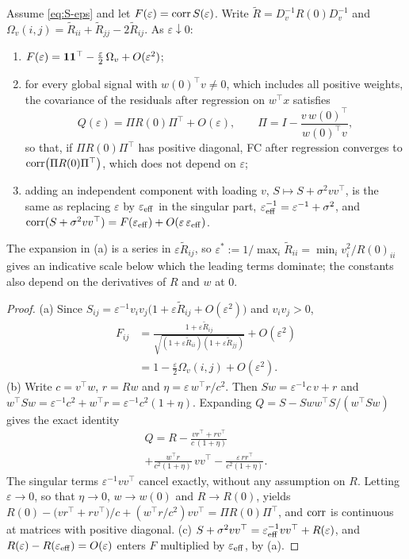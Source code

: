 \begin{theorem}\label{thm:confound}
Assume \eqref{eq:S-eps} and let $F(\varepsilon)=\operatorname{corr} S(\varepsilon)$. Write
$\tilde R=D_v^{-1}R(0)D_v^{-1}$ and $\Omega_v(i,j)=\tilde R_{ii}+\tilde R_{jj}-2\tilde R_{ij}$. As $\varepsilon\downarrow0$:
\begin{enumerate}
  \item[(a)] $F(\varepsilon)=\mathbf 1\mathbf 1^\top-\tfrac{\varepsilon}{2}\,\Omega_v+O(\varepsilon^2)$;
  \item[(b)] for every global signal with $w(0)^\top v\ne0$, which includes all positive weights, the covariance of the residuals after regression on $w^\top x$ satisfies
  \[
    Q(\varepsilon)=\Pi R(0)\Pi^\top+O(\varepsilon),\qquad \Pi=I-\frac{v\,w(0)^\top}{w(0)^\top v},
  \]
  so that, if $\Pi R(0)\Pi^\top$ has positive diagonal, FC after regression converges to $\operatorname{corr}\bigl(\Pi R(0)\Pi^\top\bigr)$, which does not depend on $\varepsilon$;
  \item[(c)] adding an independent component with loading $v$, $S\mapsto S+\sigma^2vv^\top$, is the same as replacing $\varepsilon$ by $\varepsilon_{\rm eff}$ in the singular part, $\varepsilon_{\rm eff}^{-1}=\varepsilon^{-1}+\sigma^2$, and $\operatorname{corr}(S+\sigma^2vv^\top)=F(\varepsilon_{\rm eff})+O(\varepsilon\,\varepsilon_{\rm eff})$.
\end{enumerate}
The expansion in (a) is a series in $\varepsilon\tilde R_{ij}$, so $\varepsilon^*:=1/\max_i\tilde R_{ii}=\min_iv_i^2/R(0)_{ii}$ gives an indicative scale below which the leading terms dominate; the constants also depend on the derivatives of $R$ and $w$ at $0$.
\end{theorem}

\begin{proof}
(a) Since $S_{ij}=\varepsilon^{-1}v_iv_j\bigl(1+\varepsilon\tilde R_{ij}+O(\varepsilon^2)\bigr)$ and $v_iv_j>0$,
\begin{align*}
  F_{ij}&=\frac{1+\varepsilon\tilde R_{ij}}{\sqrt{(1+\varepsilon\tilde R_{ii})(1+\varepsilon\tilde R_{jj})}}+O(\varepsilon^2)\\
  &=1-\tfrac{\varepsilon}{2}\Omega_v(i,j)+O(\varepsilon^2).
\end{align*}
(b) Write $c=v^\top w$, $r=R w$ and $\eta=\varepsilon\,w^\top r/c^2$. Then $Sw=\varepsilon^{-1}c\,v+r$ and $w^\top Sw=\varepsilon^{-1}c^2+w^\top r=\varepsilon^{-1}c^2(1+\eta)$. Expanding $Q=S-Sww^\top S/(w^\top Sw)$ gives the exact identity
\begin{multline*}
  Q=R-\frac{v r^\top+r v^\top}{c\,(1+\eta)}\\
  +\frac{w^\top r}{c^2(1+\eta)}\,vv^\top-\frac{\varepsilon\,rr^\top}{c^2(1+\eta)}.
\end{multline*}
The singular terms $\varepsilon^{-1}vv^\top$ cancel exactly, without any assumption on $R$. Letting $\varepsilon\to0$, so that $\eta\to0$, $w\to w(0)$ and $R\to R(0)$, yields $R(0)-\bigl(vr^\top+rv^\top\bigr)/c+(w^\top r/c^2)vv^\top=\Pi R(0)\Pi^\top$, and $\operatorname{corr}$ is continuous at matrices with positive diagonal.
(c) $S+\sigma^2vv^\top=\varepsilon_{\rm eff}^{-1}vv^\top+R(\varepsilon)$, and $R(\varepsilon)-R(\varepsilon_{\rm eff})=O(\varepsilon)$ enters $F$ multiplied by $\varepsilon_{\rm eff}$, by (a).
\end{proof}

